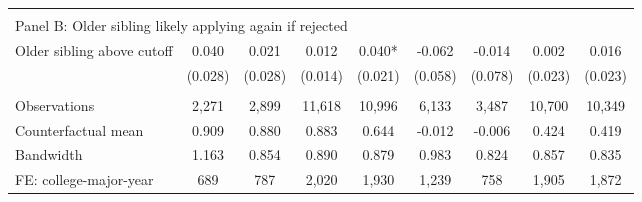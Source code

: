 {{\begin{tabular}{lcccccccc}
&  &  &  & & & & & &    \\
\multicolumn{9}{l}{Panel B: Older sibling likely applying again if rejected} \\
Older sibling above cutoff&       0.040   &       0.021   &       0.012   &       0.040*  &      -0.062   &      -0.014   &       0.002   &       0.016   \\
                    &     (0.028)   &     (0.028)   &     (0.014)   &     (0.021)   &     (0.058)   &     (0.078)   &     (0.023)   &     (0.023)   \\
                    &               &               &               &               &               &               &               &               \\
Observations        &       2,271   &       2,899   &      11,618   &      10,996   &       6,133   &       3,487   &      10,700   &      10,349   \\
Counterfactual mean &       0.909   &       0.880   &       0.883   &       0.644   &      -0.012   &      -0.006   &       0.424   &       0.419   \\
Bandwidth           &       1.163   &       0.854   &       0.890   &       0.879   &       0.983   &       0.824   &       0.857   &       0.835   \\
FE: college-major-year&         689   &         787   &       2,020   &       1,930   &       1,239   &         758   &       1,905   &       1,872   \\
 

\bottomrule
\end{tabular}
}
}
